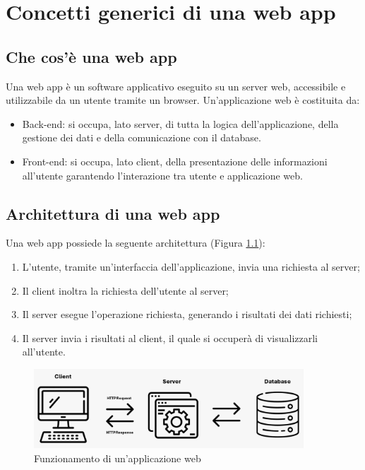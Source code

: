 \chapter{Concetti generici di una web app}
\section{Che cos'è una web app}
Una web app è un software applicativo eseguito su un server web, accessibile e utilizzabile da un utente tramite un browser.\cite{webApp1}
Un'applicazione web è costituita da:
\begin{itemize}
    \item Back-end: si occupa, lato server, di tutta la logica dell'applicazione, della gestione dei dati e della comunicazione con il database.
    \item Front-end: si occupa, lato client, della presentazione delle informazioni all'utente garantendo l'interazione tra utente e applicazione web.
\end{itemize}
\section{Architettura di una web app}
Una web app possiede la seguente architettura (Figura \ref{fig:funzionamento-web-app}):
\begin{enumerate}
    \item L'utente, tramite un'interfaccia dell'applicazione, invia una richiesta al server;
    \item Il client inoltra la richiesta dell'utente al server;
    \item Il server esegue l'operazione richiesta, generando i risultati dei dati richiesti;
    \item Il server invia i risultati al client, il quale si occuperà di visualizzarli all'utente.
\end{enumerate}
\begin{figure}[h]
    \centering
    \includegraphics[width=0.9\textwidth]{images/funzionamentoWebApp.png}
    \caption{Funzionamento di un'applicazione web}
    \label{fig:funzionamento-web-app}
\end{figure}